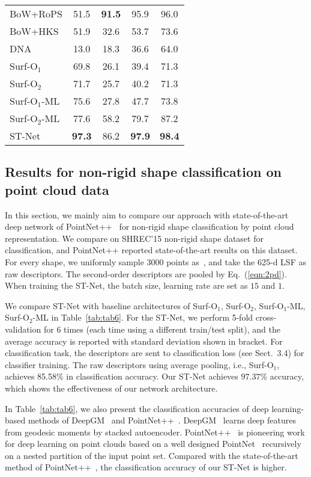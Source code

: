 \documentclass[runningheads]{llncs}
\begin{document}
\begin{table}
\begin{center}
{\begin{tabular}{|l||  c  c  c   c|}
BoW+RoPS    &51.5 &\textbf{91.5} &95.9 &96.0\\
BoW+HKS       &51.9 &32.6 &53.7 &73.6 \\
DNA~\cite{reuter2006laplacebeltrami} &13.0 &18.3 &36.6 &64.0\\
\hline
Surf-O$_1$  &69.8 &26.1& 39.4 &71.3 \\
Surf-O$_2$  &71.7 &25.7 & 40.2&71.3 \\
Surf-O$_1$-ML  & 75.6&27.8 &47.7 &73.8 \\
Surf-O$_2$-ML &77.6 &58.2 &79.7 &87.2 \\
ST-Net  &\textbf{97.3} &86.2 &\textbf{97.9} &\textbf{98.4} \\
\hline
\end{tabular}
}
\label{tab:tab55}
\end{center}
\end{table}


\subsection{Results for  non-rigid shape classification on point cloud data}
In this section, we mainly aim to compare our approach with state-of-the-art deep network of PointNet++~\cite{qi2017pointnetplusplus} for non-rigid shape classification by point cloud representation. We compare on SHREC'15 non-rigid shape dataset for classification, and PointNet++ reported state-of-the-art results on this dataset. For every shape, we uniformly sample 3000 points as~\cite{Osada2002Shape}, and take the 625-d LSF as raw descriptors. The second-order descriptors are pooled by Eq.~(\ref{eqn:2pd}).  When training the ST-Net, the batch size, learning rate are set as $15$ and $1$. 


We compare ST-Net with baseline architectures of Surf-O$_1$, Surf-O$_2$, Surf-O$_1$-ML, Surf-O$_2$-ML in Table~\ref{tab:tab6}. For the ST-Net, we perform 5-fold cross-validation for 6 times (each time using a different  train/test split), and the average accuracy is reported with standard deviation shown in bracket. For classification task, the descriptors are sent to classification loss (see Sect.~3.4) for classifier training. The raw descriptors using average pooling, i.e., Surf-O$_1$, achieves 85.58\%  in classification accuracy. Our ST-Net  achieves $97.37\%$ accuracy, which shows the effectiveness of our network architecture.
 
  
In Table~\ref{tab:tab6}, we also present the classification accuracies of  deep learning-based methods of DeepGM~\cite{Luciano2017Deep} and PointNet++~\cite{qi2017pointnetplusplus}. DeepGM~\cite{Luciano2017Deep} learns deep features from geodesic moments by stacked autoencoder. PointNet++~\cite{qi2017pointnetplusplus} is pioneering work for deep learning on point clouds based on a well designed PointNet~\cite{qsmgpdlps3dcs17} recursively on a nested partition of the input point set. 
Compared with the state-of-the-art method of PointNet++~\cite{qi2017pointnetplusplus}, the classification accuracy of our ST-Net is higher. 
\end{document}
